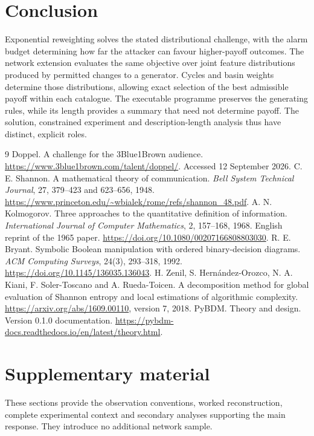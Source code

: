 \documentclass[11pt,a4paper]{article}
\begin{document}
\section{Conclusion}
Exponential reweighting solves the stated distributional challenge, with
the alarm budget determining how far the attacker can favour higher-payoff
outcomes. The network extension evaluates the same objective over joint
feature distributions produced by permitted changes to a generator.
Cycles and basin weights determine those distributions, allowing exact
selection of the best admissible payoff within each catalogue.
The executable programme preserves the generating rules, while its length
provides a summary that need not determine payoff. The solution, constrained
experiment and description-length analysis thus have distinct, explicit roles.

\FloatBarrier
\begin{thebibliography}{9}
 Doppel. A challenge for the 3Blue1Brown audience.
\url{https://www.3blue1brown.com/talent/doppel/}.
Accessed 12 September 2026.
 C. E. Shannon. A mathematical theory of communication.
\emph{Bell System Technical Journal}, 27, 379--423 and 623--656, 1948.
\url{https://www.princeton.edu/~wbialek/rome/refs/shannon_48.pdf}.
 A. N. Kolmogorov. Three approaches to the quantitative
definition of information. \emph{International Journal of Computer
Mathematics}, 2, 157--168, 1968. English reprint of the 1965 paper.
\url{https://doi.org/10.1080/00207166808803030}.
 R. E. Bryant. Symbolic Boolean manipulation with ordered
binary-decision diagrams. \emph{ACM Computing Surveys}, 24(3), 293--318,
1992. \url{https://doi.org/10.1145/136035.136043}.
 H. Zenil, S. Hern\'andez-Orozco, N. A. Kiani,
F. Soler-Toscano and A. Rueda-Toicen. A decomposition method for global
evaluation of Shannon entropy and local estimations of algorithmic
complexity. \url{https://arxiv.org/abs/1609.00110}, version 7, 2018.
 PyBDM. Theory and design. Version 0.1.0 documentation.
\url{https://pybdm-docs.readthedocs.io/en/latest/theory.html}.
\end{thebibliography}
\clearpage
\appendix
\section*{Supplementary material}
\label{supplement-start}
These sections provide the observation conventions, worked reconstruction,
complete experimental context and secondary analyses supporting the main
response. They introduce no additional network sample.
\end{document}
